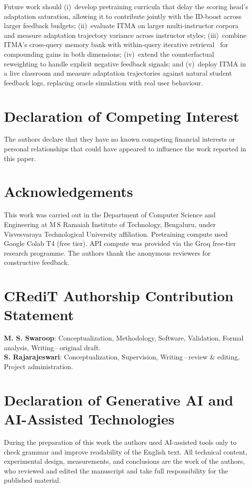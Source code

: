\documentclass[preprint,12pt]{elsarticle}
\begin{document}
Future work should (i)~develop pretraining curricula that delay the scoring
head's adaptation saturation, allowing it to contribute jointly with the
ID-boost across larger feedback budgets;
(ii)~evaluate ITMA on larger multi-instructor corpora and measure adaptation
trajectory variance across instructor styles; (iii)~combine ITMA's cross-query
memory bank with within-query iterative retrieval~\citep{jiang2023active} for
compounding gains in both dimensions; (iv)~extend the counterfactual
reweighting to handle explicit negative feedback signals; and (v)~deploy ITMA
in a live classroom and measure adaptation trajectories against natural student
feedback logs, replacing oracle simulation with real user behaviour.

\section*{Declaration of Competing Interest}
The authors declare that they have no known competing financial interests or
personal relationships that could have appeared to influence the work reported
in this paper.

\section*{Acknowledgements}
This work was carried out in the Department of Computer Science and Engineering
at M\,S Ramaiah Institute of Technology, Bengaluru, under Visvesvaraya
Technological University affiliation.  Pretraining compute used Google Colab
T4 (free tier).  API compute was provided via the Groq free-tier research
programme.  The authors thank the anonymous reviewers for constructive feedback.

\section*{CRediT Authorship Contribution Statement}
\textbf{M. S. Swaroop}: Conceptualization, Methodology, Software,
Validation, Formal analysis, Writing\,--\,original draft.\\
\textbf{S. Rajarajeswari}: Conceptualization, Supervision,
Writing\,--\,review \& editing, Project administration.

\section*{Declaration of Generative AI and AI-Assisted Technologies}
During the preparation of this work the authors used AI-assisted tools only
to check grammar and improve readability of the English text.  All technical
content, experimental design, measurements, and conclusions are the work of
the authors, who reviewed and edited the manuscript and take full
responsibility for the published material.
\end{document}

